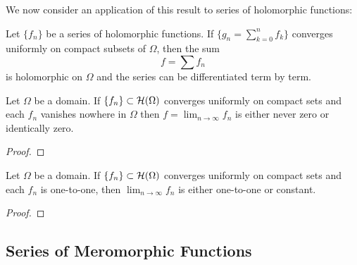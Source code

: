 \documentclass{article}
\begin{document}
We now consider an application of this result to series of holomorphic functions:
\begin{corollary}
Let \(\{f_n\}\) be a series of holomorphic functions. If \(\{g_n = \sum_{k = 0}^nf_k\}\) converges uniformly on compact subsets of \(\Omega\), then the sum
\begin{equation}f = \sum f_n\end{equation}
is holomorphic on \(\Omega\) and the series can be differentiated term by term.
\end{corollary}
\begin{proposition}
Let \(\Omega\) be a domain. If \(\{f_n\} \subset \mathcal{H}(\Omega)\) converges uniformly on compact sets and each \(f_n\) vanishes nowhere in \(\Omega\) then \(f = \lim_{n \to \infty}f_n\) is either never zero or identically zero.
\end{proposition}
\begin{proof}
\end{proof}
\begin{corollary}
Let \(\Omega\) be a domain. If \(\{f_n\} \subset \mathcal{H}(\Omega)\) converges uniformly on compact sets and each \(f_n\) is one-to-one, then \(\lim_{n \to \infty}f_n\) is either one-to-one or constant.
\end{corollary}
\begin{proof}
\end{proof}


\subsection{Series of Meromorphic Functions}
\end{document}
